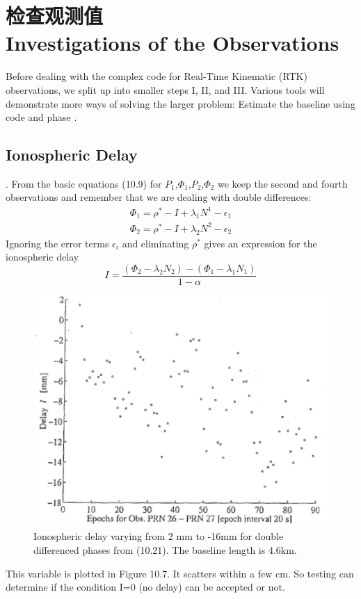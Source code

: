 \section[检查观测值]{检查观测值\\Investigations of the Observations}
Before dealing with the complex code for Real-Time Kinematic (RTK) observations, we
split up into smaller steps I, II, and III. Various tools will demonstrate more ways of solving the larger problem: Estimate the baseline using code and phase .

\subsection{Ionospheric Delay}

\uppercase\expandafter{}. From the basic equations (10.9) for $P_{1}$,$\Phi_{1}$,$P_{2}$,$\Phi_{2}$ we keep the second and fourth observations and remember that we are dealing with double differences:
\begin{equation}
\begin{split}
\Phi_{1}=\rho^{*}-I+\lambda_{1}N^{1}-\epsilon_{1}\\
\Phi_{2}=\rho^{*}-I+\lambda_{2}N^{2}-\epsilon_{2}
\end{split}
\end{equation}
Ignoring the error terms $\epsilon_{i}$ and eliminating $\rho^{*}$ gives an expression for the ionospheric delay
\begin{equation}
I=\frac{(\Phi_{2}-\lambda_{2}N_{2})-(\Phi_{1}-\lambda_{1}N_{1})}{1-\alpha}
\end{equation}

\begin{figure}
	\centering
	\includegraphics[width=0.4\linewidth]{TeX_files/Part03/chapter10/image/9-7}
	\caption{Ionospheric delay varying from 2 mm to -16mm for double differenced phases from (10.21). The baseline length is 4.6km.}
	\label{fig:9-7}
\end{figure}

This variable is plotted in Figure 10.7. It scatters within a few cm. So testing can determine if the condition I=0 (no delay) can be accepted or not.

